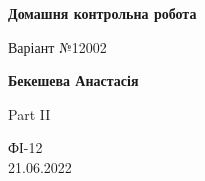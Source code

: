 \documentclass[a4paper,12pt, centered]{article}
\begin{document}
\begin{titlepage}
    \begin{center}
        \vspace*{1cm}
            
        \Huge
        \textbf{Домашня контрольна робота}
            
        \vspace{0.5cm}
        \LARGE
        Варіант №12002
            
        \vspace{1.5cm}
            
        \textbf{Бекешева Анастасія}
            
        \vfill
            
        Part II
            
        \vspace{0.8cm}
            

            
        \Large
        ФІ-12\\21.06.2022
            
    \end{center}
\end{titlepage}
\end{document}
